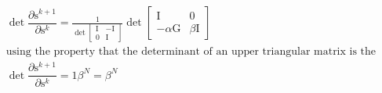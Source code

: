 \documentclass[12pt,letterpaper]{article} %
\newcommand{\bs}[1]{\bm{\mathrm{#1}}} %
\begin{document}
\begin{align*}
&\det \dfrac{\partial \bs{s}^{k+1}}{\partial \bs{s}^{k}} = \frac{1}{\det \begin{bmatrix} \bs{I} & \bs{-I}\\ \bs{0} & \bs{I} \end{bmatrix}} \det\begin{bmatrix} \bs{I} & \bs{0}\\ -\alpha\bs{G} & \beta\bs{I}\end{bmatrix} \\
&\text{using the property that the determinant of an upper triangular matrix is the product of the diagonals:}\\
&\det \dfrac{\partial \bs{s}^{k+1}}{\partial \bs{s}^{k}} = 1\beta^N =\beta^N \\
\end{align*}




\end{document}
